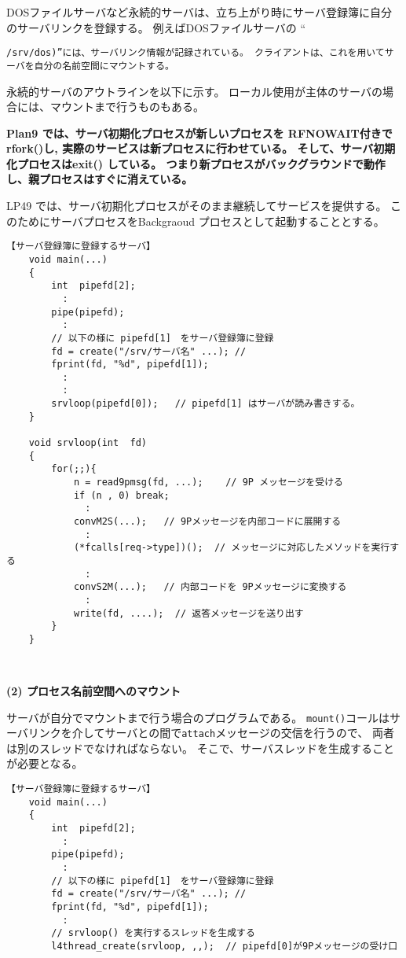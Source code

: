 DOSファイルサーバなど永続的サーバは、立ち上がり時にサーバ登録簿に自分のサーバリンクを登録する。
例えばDOSファイルサーバの ``{\tt /srv/dos)''には、サーバリンク情報が記録されている。
クライアントは、これを用いてサーバを自分の名前空間にマウントする。

永続的サーバのアウトラインを以下に示す。
ローカル使用が主体のサーバの場合には、マウントまで行うものもある。

{\bf Plan9 では、サーバ初期化プロセスが新しいプロセスを RFNOWAIT付きで rfork()し,
実際のサービスは新プロセスに行わせている。
そして、サーバ初期化プロセスはexit() している。
つまり新プロセスがバックグラウンドで動作し、親プロセスはすぐに消えている。

LP49 では、サーバ初期化プロセスがそのまま継続してサービスを提供する。
このためにサーバプロセスをBackgraoud プロセスとして起動することとする。
}

{\small
\begin{verbatim}
【サーバ登録簿に登録するサーバ】 
    void main(...)
    {
        int  pipefd[2];
          :
        pipe(pipefd);
          :
        // 以下の様に pipefd[1]　をサーバ登録簿に登録
        fd = create("/srv/サーバ名" ...); // 
        fprint(fd, "%d", pipefd[1]);
          :
          :
        srvloop(pipefd[0]);   // pipefd[1] はサーバが読み書きする。
    }
   
    void srvloop(int  fd)
    {
        for(;;){ 
            n = read9pmsg(fd, ...);    // 9P メッセージを受ける
            if (n , 0) break;
              :
            convM2S(...);   // 9Pメッセージを内部コードに展開する
              :
            (*fcalls[req->type])();  // メッセージに対応したメソッドを実行する
              :
            convS2M(...);   // 内部コードを 9Pメッセージに変換する 
              :
            write(fd, ....);  // 返答メッセージを送り出す
        }
    }

  
\end{verbatim}
}


{\bf\flushleft  (2) プロセス名前空間へのマウント}

サーバが自分でマウントまで行う場合のプログラムである。
{\tt mount()}コールはサーバリンクを介してサーバとの間で{\tt attach}メッセージの交信を行うので、
両者は別のスレッドでなければならない。
そこで、サーバスレッドを生成することが必要となる。

{\small
\begin{verbatim}
【サーバ登録簿に登録するサーバ】 
    void main(...)
    {
        int  pipefd[2];
          :
        pipe(pipefd);
          :
        // 以下の様に pipefd[1]　をサーバ登録簿に登録
        fd = create("/srv/サーバ名" ...); // 
        fprint(fd, "%d", pipefd[1]);
          :
        // srvloop() を実行するスレッドを生成する
        l4thread_create(srvloop, ,,);  // pipefd[0]が9Pメッセージの受け口


\end{verbatim}}}
